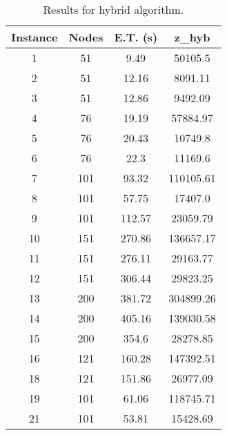 \documentclass[10pt,twoside]{article}
\begin{document}
\begin{table}[H]
\centering
\begin{tabular}{cccc}
\hline
\textbf{Instance} & \textbf{Nodes} & \textbf{E.T. (s)} & \textbf{z\_hyb} \\ \hline
1                 & 51             & 9.49              & 50105.5        \\
2                 & 51             & 12.16             & 8091.11        \\
3                 & 51             & 12.86             & 9492.09        \\
4                 & 76             & 19.19             & 57884.97       \\
5                 & 76             & 20.43             & 10749.8        \\
6                 & 76             & 22.3              & 11169.6        \\
7                 & 101            & 93.32             & 110105.61      \\
8                 & 101            & 57.75             & 17407.0        \\
9                 & 101            & 112.57            & 23059.79       \\
10                & 151            & 270.86            & 136657.17      \\
11                & 151            & 276.11            & 29163.77       \\
12                & 151            & 306.44            & 29823.25       \\
13                & 200            & 381.72            & 304899.26      \\
14                & 200            & 405.16            & 139030.58      \\
15                & 200            & 354.6             & 28278.85       \\
16                & 121            & 160.28            & 147392.51      \\
18                & 121            & 151.86            & 26977.09       \\
19                & 101            & 61.06             & 118745.71      \\
21                & 101            & 53.81             & 15428.69       \\ \hline
\end{tabular}
\caption{Results for hybrid algorithm.}
\label{tab:res}
\end{table}
\end{document}
